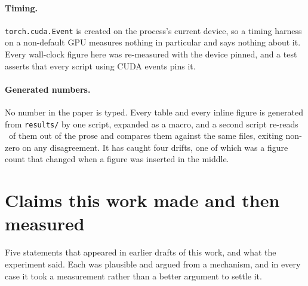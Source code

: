 \paragraph{Timing.} \texttt{torch.cuda.Event} is created on the process's
current device, so a timing harness on a non-default GPU measures nothing in
particular and says nothing about it. Every wall-clock figure here was
re-measured with the device pinned, and a test asserts that every script using
CUDA events pins it.

\paragraph{Generated numbers.} No number in the paper is typed. Every table and
every inline figure is generated from \texttt{results/} by one script, expanded
as a macro, and a second script re-reads \NumClaims\ of them out of the prose
and compares them against the same files, exiting non-zero on any disagreement.
It has caught four drifts, one of which was a figure count that changed when a
figure was inserted in the middle.

\section{Claims this work made and then measured}

Five statements that appeared in earlier drafts of this work, and what the
experiment said. Each was plausible and argued from a mechanism, and in every
case it took a measurement rather than a better argument to settle it.

